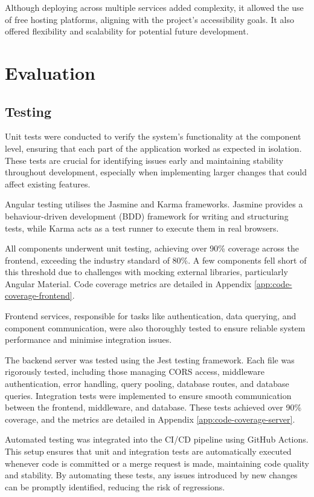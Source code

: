 \documentclass{l4proj}
\begin{document}
Although deploying across multiple services added complexity, it allowed the use of free hosting platforms, aligning with the project's accessibility goals. It also offered flexibility and scalability for potential future development.


\chapter{Evaluation} 

\section{Testing}
Unit tests were conducted to verify the system’s functionality at the component level, ensuring that each part of the application worked as expected in isolation. These tests are crucial for identifying issues early and maintaining stability throughout development, especially when implementing larger changes that could affect existing features.

Angular testing utilises the Jasmine and Karma frameworks. Jasmine provides a behaviour-driven development (BDD) framework for writing and structuring tests, while Karma acts as a test runner to execute them in real browsers.

All components underwent unit testing, achieving over 90\% coverage across the frontend, exceeding the industry standard of 80\%. A few components fell short of this threshold due to challenges with mocking external libraries, particularly Angular Material. Code coverage metrics are detailed in Appendix \ref{app:code-coverage-frontend}.

Frontend services, responsible for tasks like authentication, data querying, and component communication, were also thoroughly tested to ensure reliable system performance and minimise integration issues.

The backend server was tested using the Jest testing framework. Each file was rigorously tested, including those managing CORS access, middleware authentication, error handling, query pooling, database routes, and database queries. Integration tests were implemented to ensure smooth communication between the frontend, middleware, and database. These tests achieved over 90\% coverage, and the metrics are detailed in Appendix \ref{app:code-coverage-server}.

Automated testing was integrated into the CI/CD pipeline using GitHub Actions. This setup ensures that unit and integration tests are automatically executed whenever code is committed or a merge request is made, maintaining code quality and stability. By automating these tests, any issues introduced by new changes can be promptly identified, reducing the risk of regressions.
\end{document}
